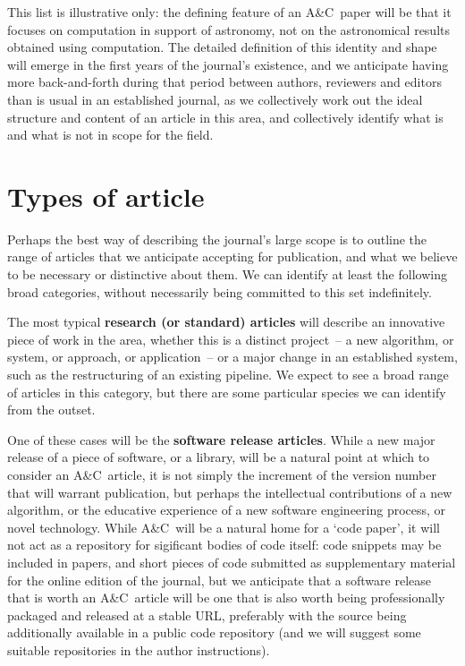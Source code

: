 \documentclass[11pt,twoside]{article}
\newcommand{\ac}{A\&C}
\begin{document}
This list is illustrative only: the defining feature of an \ac\ paper will be that it focuses on computation in support of astronomy, not on the astronomical results obtained using computation. 
The detailed definition of this identity and shape will emerge in the first years of the
journal's existence, and we anticipate having more back-and-forth
during that period between authors, reviewers and editors than is usual in an
established journal, as we collectively work out the ideal structure
and content of an article in this area, and collectively identify what
is and what is not in scope for the field.



\section{Types of article}
\label{types}

Perhaps the best way of describing the journal's large scope is to
outline the range of articles that we anticipate accepting for publication,
and what we believe to be necessary or distinctive about them.  We
can identify at least the following broad categories, without necessarily being
committed to this set indefinitely.

The most typical \textbf{research (or standard) articles} will describe an
innovative piece of work in the area, whether this
is a distinct project~-- a new algorithm, or system, or approach, or
application~-- or a major change in an established system, such as the
restructuring of an existing pipeline.  We expect to see a broad range
of articles in this category, but there are some particular species we
can identify from the outset.

One of these cases will be the \textbf{software release
articles}.   While a new major release of a piece of software, or a
library, will be a natural point at which to consider an \ac\ article,
it is not simply the increment of the version number that will
warrant publication, but perhaps the intellectual contributions of a
new algorithm, or the educative experience of a new software
engineering process, or novel technology. While \ac\ will be a natural home for a `code
paper', it will not act as a repository for sigificant bodies of code itself: code snippets may
be included in papers, and short pieces of code submitted as supplementary material for the online edition of the journal, but  we anticipate that a software release that is
worth an \ac\ article will be one that is also worth being professionally packaged and
released at a stable URL, preferably with the source being additionally
available in a public code repository (and we will suggest some suitable
repositories in the author instructions).  
\end{document}

